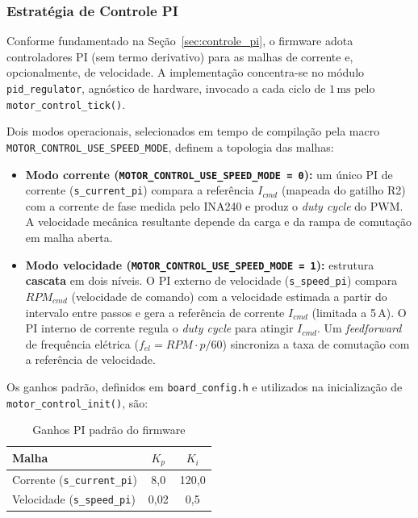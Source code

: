 \subsubsection{Estratégia de Controle PI}
\label{subsec:estrategia_pi}

Conforme fundamentado na Seção~\ref{sec:controle_pi}, o firmware adota controladores PI (sem termo derivativo) para as malhas de corrente e, opcionalmente, de velocidade. A implementação concentra-se no módulo \texttt{pid\_regulator}, agnóstico de hardware, invocado a cada ciclo de $1\,\text{ms}$ pelo \texttt{motor\_control\_tick()}.

Dois modos operacionais, selecionados em tempo de compilação pela macro \texttt{MOTOR\_CONTROL\_USE\_SPEED\_MODE}, definem a topologia das malhas:

\begin{itemize}
    \item \textbf{Modo corrente (\texttt{MOTOR\_CONTROL\_USE\_SPEED\_MODE\,=\,0}):} um único PI de corrente (\texttt{s\_current\_pi}) compara a referência $I_{cmd}$ (mapeada do gatilho R2) com a corrente de fase medida pelo INA240 e produz o \textit{duty cycle} do PWM. A velocidade mecânica resultante depende da carga e da rampa de comutação em malha aberta.
    \item \textbf{Modo velocidade (\texttt{MOTOR\_CONTROL\_USE\_SPEED\_MODE\,=\,1}):} estrutura \textbf{cascata} em dois níveis. O PI externo de velocidade (\texttt{s\_speed\_pi}) compara $RPM_{cmd}$ (velocidade de comando) com a velocidade estimada a partir do intervalo entre passos e gera a referência de corrente $I_{cmd}$ (limitada a 5\,A). O PI interno de corrente regula o \textit{duty cycle} para atingir $I_{cmd}$. Um \textit{feedforward} de frequência elétrica ($f_{el} = RPM \cdot p / 60$) sincroniza a taxa de comutação com a referência de velocidade.
\end{itemize}

Os ganhos padrão, definidos em \texttt{board\_config.h} e utilizados na inicialização de \texttt{motor\_control\_init()}, são:

\begin{table}[H]
\centering
\caption{Ganhos PI padrão do firmware}
\label{tab:pi_ganhos_default}
\begin{tabular}{lcc}
\toprule
\textbf{Malha} & $K_p$ & $K_i$ \\
\midrule
Corrente (\texttt{s\_current\_pi}) & 8{,}0 & 120{,}0 \\
Velocidade (\texttt{s\_speed\_pi}) & 0{,}02 & 0{,}5 \\
\bottomrule
\end{tabular}
\end{table}


